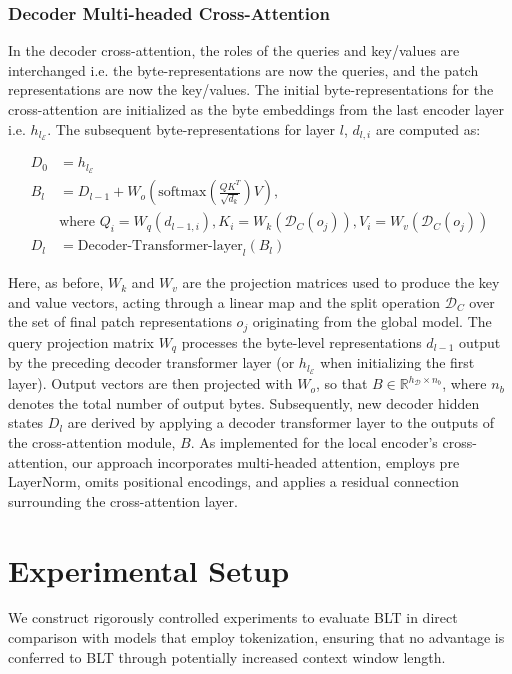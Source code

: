 \subsubsection{Decoder Multi-headed Cross-Attention} 

In the decoder cross-attention, the roles of the queries and key/values are interchanged i.e. the byte-representations are now the queries, and the patch representations are now the key/values. The initial byte-representations for the cross-attention are initialized as the byte embeddings from the last encoder layer i.e. $h_{l_{\mathcal{E}}}$. The subsequent byte-representations for layer $l$, $d_{l,i}$ are computed as:

\begin{align}
D_0 &= h_{l_{\mathcal{E}}} \\
B_l &= D_{l-1} + W_o\left(\text{softmax}\left(\frac{QK^T}{\sqrt{d_k}}\right)V\right), \\
  &\text{where } Q_i = W_q(d_{l-1,i}), K_i = W_k(\mathcal{D}_C(o_j)), V_i = W_v(\mathcal{D}_C(o_j)) \\
  D_l &= \text{Decoder-Transformer-layer}_l(B_l)
\end{align}

Here, as before, $W_k$ and $W_v$ are the projection matrices used to produce the key and value vectors, acting through a linear map and the split operation $\mathcal{D}_C$ over the set of final patch representations $o_j$ originating from the global model. The query projection matrix $W_q$ processes the byte-level representations $d_{l-1}$ output by the preceding decoder transformer layer (or $h_{l_{\mathcal{E}}}$ when initializing the first layer). Output vectors are then projected with $W_o$, so that $B \in \mathbb{R}^{h_{\mathcal{D}} \times n_b}$, where $n_b$ denotes the total number of output bytes. Subsequently, new decoder hidden states $D_l$ are derived by applying a decoder transformer layer to the outputs of the cross-attention module, $B$. As implemented for the local encoder’s cross-attention, our approach incorporates multi-headed attention, employs pre LayerNorm, omits positional encodings, and applies a residual connection surrounding the cross-attention layer.

\section{Experimental Setup}
\label{section:experiments}
We construct rigorously controlled experiments to evaluate {\textsc BLT} in direct comparison with models that employ tokenization, ensuring that no advantage is conferred to {\textsc BLT} through potentially increased context window length.

